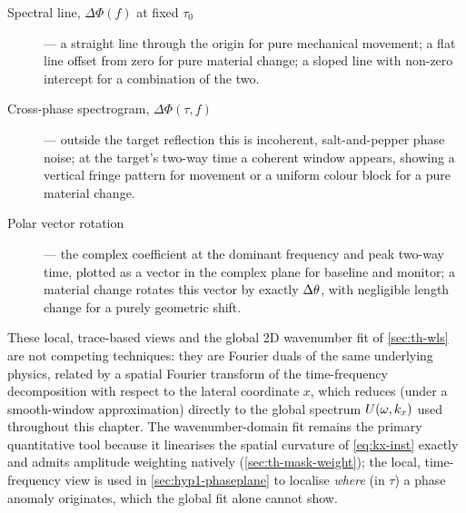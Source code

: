 \begin{description}
  \item[Spectral line, $\Delta\Phi(f)$ at fixed $\tau_0$] --- a straight line
    through the origin for pure mechanical movement; a flat line offset from
    zero for pure material change; a sloped line with non-zero intercept for
    a combination of the two.
  \item[Cross-phase spectrogram, $\Delta\Phi(\tau,f)$] --- outside the target
    reflection this is incoherent, salt-and-pepper phase noise; at the
    target's two-way time a coherent window appears, showing a vertical
    fringe pattern for movement or a uniform colour block for a pure material
    change.
  \item[Polar vector rotation] --- the complex coefficient at the dominant
    frequency and peak two-way time, plotted as a vector in the complex
    plane for baseline and monitor; a material change rotates this vector by
    exactly $\Delta \theta$, with negligible length change for a purely geometric
    shift.
\end{description}

These local, trace-based views and the global 2D wavenumber fit of
\cref{sec:th-wls} are not competing techniques: they are Fourier duals of the
same underlying physics, related by a spatial Fourier transform of the
time-frequency decomposition with respect to the lateral coordinate $x$,
which reduces (under a smooth-window approximation) directly to the global
spectrum $U(\omega,k_x)$ used throughout this chapter. The wavenumber-domain
fit remains the primary quantitative tool because it linearises the spatial
curvature of \cref{eq:kx-inst} exactly and admits amplitude weighting
natively (\cref{sec:th-mask-weight}); the local, time-frequency view is used
in \cref{sec:hyp1-phaseplane} to localise \emph{where} (in $\tau$) a phase
anomaly originates, which the global fit alone cannot show.

